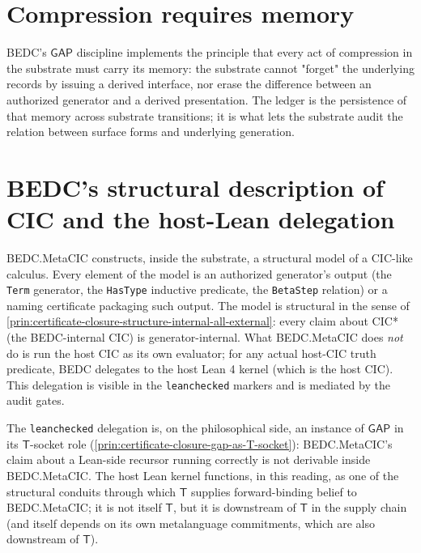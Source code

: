 \section{Compression requires memory}
\label{sec:certificate-closure-compression-requires-memory}

\begin{principle}
\label{prin:certificate-closure-compression-requires-memory}
BEDC's $\mathsf{GAP}$ discipline implements the principle that every act of compression in the substrate must carry its memory: the substrate cannot "forget" the underlying records by issuing a derived interface, nor erase the difference between an authorized generator and a derived presentation. The ledger is the persistence of that memory across substrate transitions; it is what lets the substrate audit the relation between surface forms and underlying generation.
\end{principle}

\section{BEDC's structural description of CIC and the host-Lean delegation}
\label{sec:certificate-closure-bedc-on-cic}

\begin{principle}
\label{prin:certificate-closure-bedc-on-cic-structural-only}
BEDC.MetaCIC constructs, inside the substrate, a structural model of a CIC-like calculus. Every element of the model is an authorized generator's output (the \texttt{Term} generator, the \texttt{HasType} inductive predicate, the \texttt{BetaStep} relation) or a naming certificate packaging such output. The model is structural in the sense of \autoref{prin:certificate-closure-structure-internal-all-external}: every claim about CIC* (the BEDC-internal CIC) is generator-internal. What BEDC.MetaCIC does \emph{not} do is run the host CIC as its own evaluator; for any actual host-CIC truth predicate, BEDC delegates to the host Lean 4 kernel (which is the host CIC). This delegation is visible in the \texttt{leanchecked} markers and is mediated by the audit gates.
\end{principle}

\begin{remark}
\label{rem:certificate-closure-host-delegation-T-socket}
The \texttt{leanchecked} delegation is, on the philosophical side, an instance of $\mathsf{GAP}$ in its $\mathsf{T}$-socket role (\autoref{prin:certificate-closure-gap-as-T-socket}): BEDC.MetaCIC's claim about a Lean-side recursor running correctly is not derivable inside BEDC.MetaCIC. The host Lean kernel functions, in this reading, as one of the structural conduits through which $\mathsf{T}$ supplies forward-binding belief to BEDC.MetaCIC; it is not itself $\mathsf{T}$, but it is downstream of $\mathsf{T}$ in the supply chain (and itself depends on its own metalanguage commitments, which are also downstream of $\mathsf{T}$).
\end{remark}

